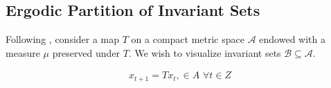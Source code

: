 \documentclass[12pt]{article}
\begin{document}





\subsection{Ergodic Partition of Invariant Sets}
\label{sec:ergod-part-invar}

Following \citep{ergodicvisual}, consider a map $T$ on a compact metric space $\mathcal{A}$ endowed with a measure $\mu$ preserved under $T$. We wish to 
visualize invariant sets $\mathcal{B} \subseteq \mathcal{A}$.

\begin{gather*}
  x_{t+1} =T x_t,\in A\,\,\forall t \in Z
\end{gather*}
\end{document}
